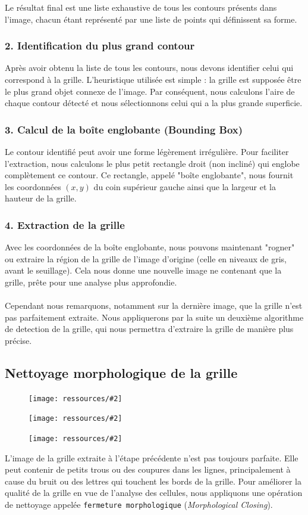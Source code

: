 \documentclass{article}
\newcommand{\stepimage}[3][0.3\textwidth]{%
  \minipage{#1}
    \texttt{[image: ressources/\#2]}
    \caption{#3}
  \endminipage\hfill
}
\begin{document}
Le résultat final est une liste exhaustive de tous les contours présents dans l'image, chacun étant représenté par une liste de points qui définissent sa forme.

\subsubsection{2. Identification du plus grand contour}
Après avoir obtenu la liste de tous les contours, nous devons identifier celui qui correspond à la grille. L'heuristique utilisée est simple : la grille est supposée être le plus grand objet connexe de l'image. Par conséquent, nous calculons l'aire de chaque contour détecté et nous sélectionnons celui qui a la plus grande superficie.

\subsubsection{3. Calcul de la boîte englobante (Bounding Box)}
Le contour identifié peut avoir une forme légèrement irrégulière. Pour faciliter l'extraction, nous calculons le plus petit rectangle droit (non incliné) qui englobe complètement ce contour. Ce rectangle, appelé "boîte englobante", nous fournit les coordonnées \((x, y)\) du coin supérieur gauche ainsi que la largeur et la hauteur de la grille.

\subsubsection{4. Extraction de la grille}
Avec les coordonnées de la boîte englobante, nous pouvons maintenant "rogner" ou extraire la région de la grille de l'image d'origine (celle en niveaux de gris, avant le seuillage). Cela nous donne une nouvelle image ne contenant que la grille, prête pour une analyse plus approfondie.\\\\
Cependant nous remarquons, notamment sur la dernière image, que la grille n'est pas parfaitement extraite. Nous appliquerons par la suite un deuxième algorithme de detection de la grille, qui nous permettra d'extraire la grille de manière plus précise.

\subsection{Nettoyage morphologique de la grille}

\begin{figure}[!htb]
  \stepimage[0.30\textwidth]{1step_07_cleaned_grid.png}{}
  \stepimage[0.33\textwidth]{2step_07_cleaned_grid.png}{}
  \stepimage[0.26\textwidth]{3step_07_cleaned_grid.png}{}
\end{figure}
L'image de la grille extraite à l'étape précédente n'est pas toujours parfaite. Elle peut contenir de petits trous ou des coupures dans les lignes, principalement à cause du bruit ou des lettres qui touchent les bords de la grille. Pour améliorer la qualité de la grille en vue de l'analyse des cellules, nous appliquons une opération de nettoyage appelée \texttt{fermeture morphologique} (\textit{Morphological Closing}).
\end{document}
